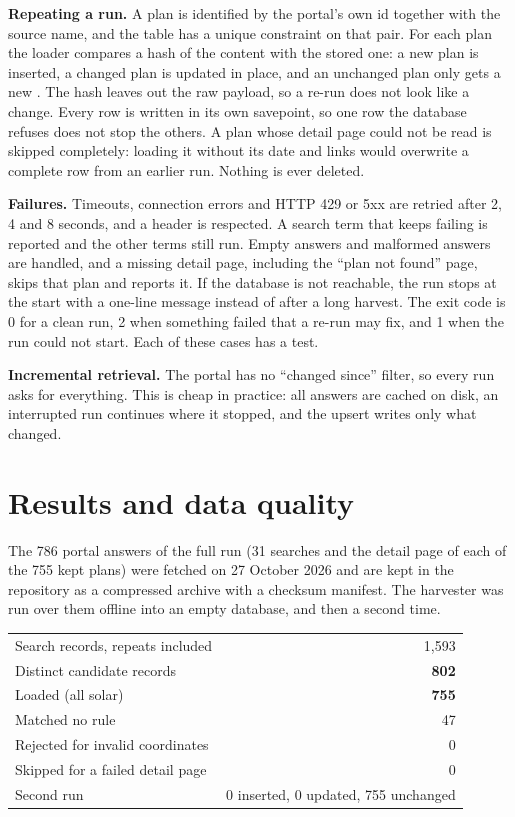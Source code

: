 \documentclass[11pt,a4paper]{article}
\newcommand{\code}[1]{{\small\codeurl{#1}}}
\begin{document}
\textbf{Repeating a run.}\label{sec:load} A plan is identified by the portal's own id together with the source name, and the
table has a unique constraint on that pair. For each plan the loader compares a hash of the content with the stored one:
a new plan is inserted, a changed plan is updated in place, and an unchanged plan only gets a new \code{last_seen_at}.
The hash leaves out the raw payload, so a re-run does not look like a change. Every row is written in its own savepoint,
so one row the database refuses does not stop the others. A plan whose detail page could not be read is skipped
completely: loading it without its date and links would overwrite a complete row from an earlier run. Nothing is ever deleted.

\textbf{Failures.}\label{sec:failures} Timeouts, connection errors and HTTP 429 or 5xx are retried after 2, 4 and 8 seconds,
and a \code{Retry-After} header is respected. A search term that keeps failing is reported and the other terms still
run. Empty answers and malformed answers are handled, and a missing detail page, including the ``plan not found'' page,
skips that plan and reports it. If the database is not reachable, the run stops at the start with a one-line message
instead of after a long harvest. The exit code is 0 for a clean run, 2 when something failed that a re-run may fix, and 1
when the run could not start. Each of these cases has a test.

\textbf{Incremental retrieval.}\label{sec:incremental} The portal has no ``changed since'' filter, so every run asks for
everything. This is cheap in practice: all answers are cached on disk, an interrupted run continues where it stopped,
and the upsert writes only what changed.

\section{Results and data quality}\label{sec:results}

The 786 portal answers of the full run (31 searches and the detail page of each of the 755 kept plans) were fetched on
27 October 2026 and are kept in the repository as a compressed archive with a checksum manifest. The harvester was run
over them offline into an empty database, and then a second time.

\begin{center}
\begin{tabularx}{0.8\textwidth}{@{}Xr@{}}
\toprule
Search records, repeats included & 1,593\\
Distinct candidate records & \textbf{802}\\
Loaded (all solar) & \textbf{755}\\
Matched no rule & 47\\
Rejected for invalid coordinates & 0\\
Skipped for a failed detail page & 0\\
Second run & 0 inserted, 0 updated, 755 unchanged\\
\bottomrule
\end{tabularx}
\end{center}
\end{document}
